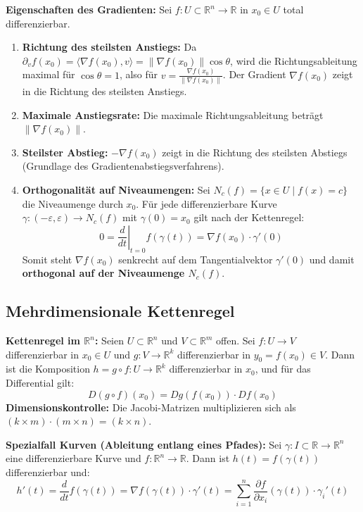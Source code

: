 \begin{theorem}
    \textbf{Eigenschaften des Gradienten:} Sei $f: U \subset \mathbb{R}^n \to \mathbb{R}$ in $x_0 \in U$ total differenzierbar.
    \begin{enumerate}
        \item \textbf{Richtung des steilsten Anstiegs:} Da $\partial_v f(x_0) = \langle \nabla f(x_0), v \rangle = \|\nabla f(x_0)\| \cos \theta$, wird die Richtungsableitung maximal für $\cos \theta = 1$, also für $v = \frac{\nabla f(x_0)}{\|\nabla f(x_0)\|}$. Der Gradient $\nabla f(x_0)$ zeigt in die Richtung des steilsten Anstiegs.
        \item \textbf{Maximale Anstiegsrate:} Die maximale Richtungsableitung beträgt $\|\nabla f(x_0)\|$.
        \item \textbf{Steilster Abstieg:} $-\nabla f(x_0)$ zeigt in die Richtung des steilsten Abstiegs (Grundlage des Gradientenabstiegsverfahrens).
        \item \textbf{Orthogonalität auf Niveaumengen:} Sei $N_c(f) = \{x \in U \mid f(x) = c\}$ die Niveaumenge durch $x_0$. Für jede differenzierbare Kurve $\gamma: (-\varepsilon, \varepsilon) \to N_c(f)$ mit $\gamma(0) = x_0$ gilt nach der Kettenregel:
        $$ 0 = \left. \frac{d}{dt} \right|_{t=0} f(\gamma(t)) = \nabla f(x_0) \cdot \gamma'(0) $$
        Somit steht $\nabla f(x_0)$ senkrecht auf dem Tangentialvektor $\gamma'(0)$ und damit \textbf{orthogonal auf der Niveaumenge $N_c(f)$}.
    \end{enumerate}
\end{theorem}

\subsection{Mehrdimensionale Kettenregel}

\begin{theorem}
    \textbf{Kettenregel im $\mathbb{R}^n$:} Seien $U \subset \mathbb{R}^n$ und $V \subset \mathbb{R}^m$ offen. Sei $f: U \to V$ differenzierbar in $x_0 \in U$ und $g: V \to \mathbb{R}^k$ differenzierbar in $y_0 = f(x_0) \in V$.
    Dann ist die Komposition $h = g \circ f: U \to \mathbb{R}^k$ differenzierbar in $x_0$, und für das Differential gilt:
    $$ D(g \circ f)(x_0) = Dg(f(x_0)) \cdot Df(x_0) $$
    \textbf{Dimensionskontrolle:} Die Jacobi-Matrizen multiplizieren sich als $(k \times m) \cdot (m \times n) = (k \times n)$.
\end{theorem}

\begin{lemma}
    \textbf{Spezialfall Kurven (Ableitung entlang eines Pfades):}
    Sei $\gamma: I \subset \mathbb{R} \to \mathbb{R}^n$ eine differenzierbare Kurve und $f: \mathbb{R}^n \to \mathbb{R}$. Dann ist $h(t) = f(\gamma(t))$ differenzierbar und:
    $$ h'(t) = \frac{d}{dt} f(\gamma(t)) = \nabla f(\gamma(t)) \cdot \gamma'(t) = \sum_{i=1}^n \frac{\partial f}{\partial x_i}(\gamma(t)) \cdot \gamma_i'(t) $$
\end{lemma}

